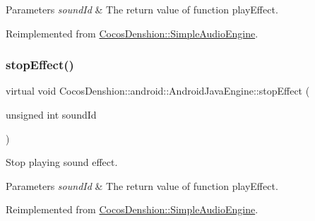 \begin{DoxyParams}{Parameters}
{\em sound\+Id} & The return value of function play\+Effect. \\
\hline
\end{DoxyParams}


Reimplemented from \hyperlink{classCocosDenshion_1_1SimpleAudioEngine_a118f6e08368f543957356a7da8ad8f71}{Cocos\+Denshion\+::\+Simple\+Audio\+Engine}.

\mbox{\label{classCocosDenshion_1_1android_1_1AndroidJavaEngine_ad8b01c7f29f3536fdb509b00678f6156}} 
\subsubsection{\texorpdfstring{stop\+Effect()}{stopEffect()}\hspace{0.1cm}{\footnotesize\ttfamily [2/2]}}
{\footnotesize\ttfamily virtual void Cocos\+Denshion\+::android\+::\+Android\+Java\+Engine\+::stop\+Effect (\begin{DoxyParamCaption}\item[{unsigned int}]{sound\+Id }\end{DoxyParamCaption})\hspace{0.3cm}{\ttfamily [virtual]}}

Stop playing sound effect.


\begin{DoxyParams}{Parameters}
{\em sound\+Id} & The return value of function play\+Effect. \\
\hline
\end{DoxyParams}


Reimplemented from \hyperlink{classCocosDenshion_1_1SimpleAudioEngine_a118f6e08368f543957356a7da8ad8f71}{Cocos\+Denshion\+::\+Simple\+Audio\+Engine}.

\mbox{\label{classCocosDenshion_1_1android_1_1AndroidJavaEngine_abd45269bfe825e27b489fccc963b57c0}} 
